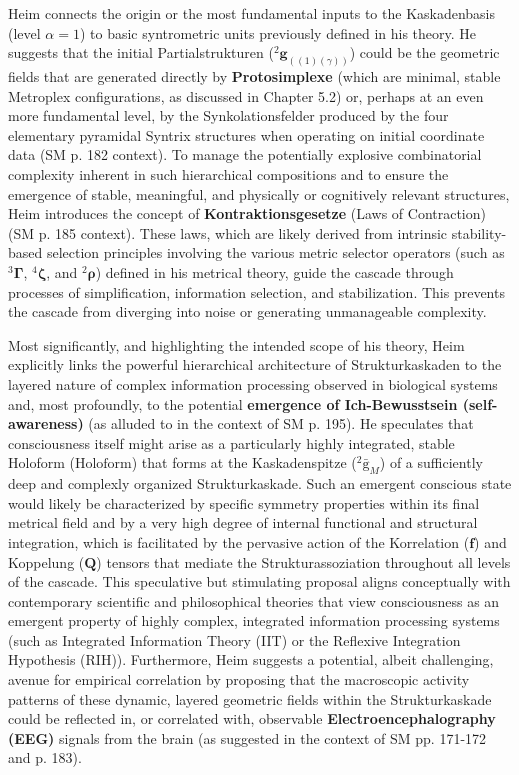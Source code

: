 \documentclass[12pt]{article}
\newcommand{\holoform}{\text{Holoform}}
\newcommand{\kompositionsfeld}{{}^2\bar{\mathrm{g}}}
\newcommand{\partialstruktur}[1]{{}^2\mathbf{g}_{(#1)}}
\newcommand{\fundamentalkondensor}{{}^3\bm{\Gamma}}
\newcommand{\korrelationstensor}{\mathbf{f}}
\newcommand{\koppelungstensor}{\mathbf{Q}}
\newcommand{\kaskadenstufe}{\alpha}
\newcommand{\strukturkompressor}{{}^4\bm{\zeta}}
\begin{document}
Heim connects the origin or the most fundamental inputs to the Kaskadenbasis (level \( \kaskadenstufe=1 \)) to basic syntrometric units previously defined in his theory. He suggests that the initial Partialstrukturen (\( \partialstruktur{(1)(\gamma)} \)) could be the geometric fields that are generated directly by \textbf{Protosimplexe} (which are minimal, stable Metroplex configurations, as discussed in Chapter 5.2) or, perhaps at an even more fundamental level, by the Synkolationsfelder produced by the four elementary pyramidal Syntrix structures when operating on initial coordinate data (SM p. 182 context). To manage the potentially explosive combinatorial complexity inherent in such hierarchical compositions and to ensure the emergence of stable, meaningful, and physically or cognitively relevant structures, Heim introduces the concept of \textbf{Kontraktionsgesetze} (Laws of Contraction) (SM p. 185 context). These laws, which are likely derived from intrinsic stability-based selection principles involving the various metric selector operators (such as \( \fundamentalkondensor \), \( \strukturkompressor \), and \( {}^2\bm{\rho} \)) defined in his metrical theory, guide the cascade through processes of simplification, information selection, and stabilization. This prevents the cascade from diverging into noise or generating unmanageable complexity.

Most significantly, and highlighting the intended scope of his theory, Heim explicitly links the powerful hierarchical architecture of Strukturkaskaden to the layered nature of complex information processing observed in biological systems and, most profoundly, to the potential \textbf{emergence of Ich-Bewusstsein (self-awareness)} (as alluded to in the context of SM p. 195). He speculates that consciousness itself might arise as a particularly highly integrated, stable Holoform (\(\holoform\)) that forms at the Kaskadenspitze (\( \kompositionsfeld_M \)) of a sufficiently deep and complexly organized Strukturkaskade. Such an emergent conscious state would likely be characterized by specific symmetry properties within its final metrical field and by a very high degree of internal functional and structural integration, which is facilitated by the pervasive action of the Korrelation (\( \korrelationstensor \)) and Koppelung (\( \koppelungstensor \)) tensors that mediate the Strukturassoziation throughout all levels of the cascade. This speculative but stimulating proposal aligns conceptually with contemporary scientific and philosophical theories that view consciousness as an emergent property of highly complex, integrated information processing systems (such as Integrated Information Theory (IIT) or the Reflexive Integration Hypothesis (RIH)). Furthermore, Heim suggests a potential, albeit challenging, avenue for empirical correlation by proposing that the macroscopic activity patterns of these dynamic, layered geometric fields within the Strukturkaskade could be reflected in, or correlated with, observable \textbf{Electroencephalography (EEG)} signals from the brain (as suggested in the context of SM pp. 171-172 and p. 183).
\end{document}
